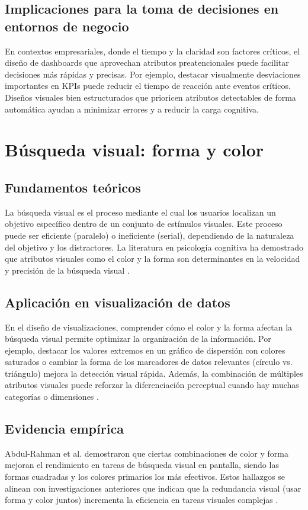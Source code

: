 \documentclass[12pt]{article}
\begin{document}
\subsection{Implicaciones para la toma de decisiones en entornos de negocio}
En contextos empresariales, donde el tiempo y la claridad son factores críticos, el diseño de dashboards que aprovechan atributos preatencionales puede facilitar decisiones más rápidas y precisas. Por ejemplo, destacar visualmente desviaciones importantes en KPIs puede reducir el tiempo de reacción ante eventos críticos. Diseños visuales bien estructurados que prioricen atributos detectables de forma automática ayudan a minimizar errores y a reducir la carga cognitiva.

\section{Búsqueda visual: forma y color}

\subsection{Fundamentos teóricos}
La búsqueda visual es el proceso mediante el cual los usuarios localizan un objetivo específico dentro de un conjunto de estímulos visuales. Este proceso puede ser eficiente (paralelo) o ineficiente (serial), dependiendo de la naturaleza del objetivo y los distractores. La literatura en psicología cognitiva ha demostrado que atributos visuales como el color y la forma son determinantes en la velocidad y precisión de la búsqueda visual \parencite{treisman1980}.

\subsection{Aplicación en visualización de datos}
En el diseño de visualizaciones, comprender cómo el color y la forma afectan la búsqueda visual permite optimizar la organización de la información. Por ejemplo, destacar los valores extremos en un gráfico de dispersión con colores saturados o cambiar la forma de los marcadores de datos relevantes (círculo vs. triángulo) mejora la detección visual rápida. Además, la combinación de múltiples atributos visuales puede reforzar la diferenciación perceptual cuando hay muchas categorías o dimensiones \parencite{mackinlay1986}.

\subsection{Evidencia empírica}
Abdul-Rahman et al. \parencite{abdurrahman2023} demostraron que ciertas combinaciones de color y forma mejoran el rendimiento en tareas de búsqueda visual en pantalla, siendo las formas cuadradas y los colores primarios los más efectivos. Estos hallazgos se alinean con investigaciones anteriores que indican que la redundancia visual (usar forma y color juntos) incrementa la eficiencia en tareas visuales complejas \parencite{callahan2019}.
\end{document}
